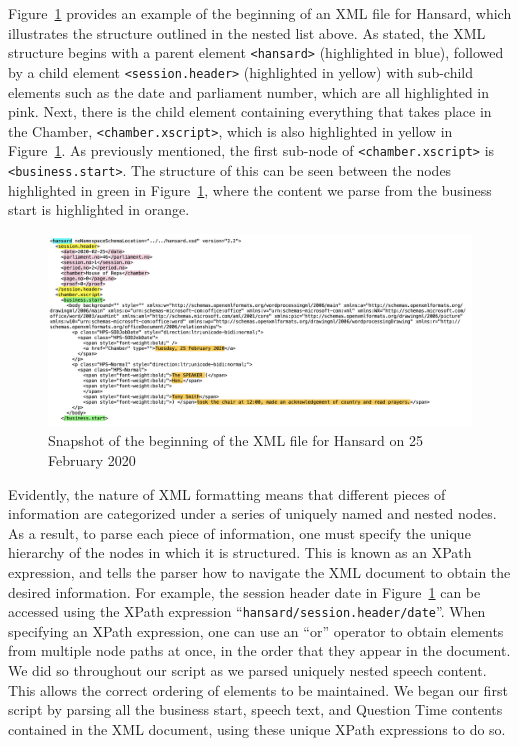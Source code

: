\documentclass[
  letterpaper,
  DIV=11,
  numbers=noendperiod]{scrartcl}
\begin{document}
Figure~\ref{fig-xml1} provides an example of the beginning of an XML
file for Hansard, which illustrates the structure outlined in the nested
list above. As stated, the XML structure begins with a parent element
\texttt{\textless{}hansard\textgreater{}} (highlighted in blue),
followed by a child element
\texttt{\textless{}session.header\textgreater{}} (highlighted in yellow)
with sub-child elements such as the date and parliament number, which
are all highlighted in pink. Next, there is the child element containing
everything that takes place in the Chamber,
\texttt{\textless{}chamber.xscript\textgreater{}}, which is also
highlighted in yellow in Figure~\ref{fig-xml1}. As previously mentioned,
the first sub-node of \texttt{\textless{}chamber.xscript\textgreater{}}
is \texttt{\textless{}business.start\textgreater{}}. The structure of
this can be seen between the nodes highlighted in green in
Figure~\ref{fig-xml1}, where the content we parse from the business
start is highlighted in orange.

\begin{figure}

{\centering \includegraphics{images/xml1.png}

}

\caption{\label{fig-xml1}Snapshot of the beginning of the XML file for
Hansard on 25 February 2020}

\end{figure}

Evidently, the nature of XML formatting means that different pieces of
information are categorized under a series of uniquely named and nested
nodes. As a result, to parse each piece of information, one must specify
the unique hierarchy of the nodes in which it is structured. This is
known as an XPath expression, and tells the parser how to navigate the
XML document to obtain the desired information. For example, the session
header date in Figure~\ref{fig-xml1} can be accessed using the XPath
expression ``\texttt{hansard/session.header/date}''. When specifying an
XPath expression, one can use an ``or'' operator to obtain elements from
multiple node paths at once, in the order that they appear in the
document. We did so throughout our script as we parsed uniquely nested
speech content. This allows the correct ordering of elements to be
maintained. We began our first script by parsing all the business start,
speech text, and Question Time contents contained in the XML document,
using these unique XPath expressions to do so.
\end{document}
